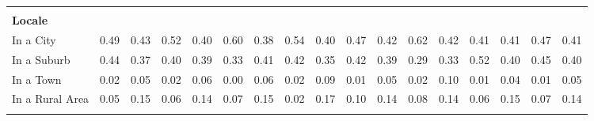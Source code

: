 \begin{tabular*}{\linewidth}{@{\extracolsep{\fill} } lcccccccccccccccc}
&&&&&&&&&&&&&&&&\\%
\multicolumn{17}{l}{\bfseries Locale}\\%
\hspace{0.2cm}In a City&0.49&0.43&0.52&0.40&0.60&0.38&0.54&0.40&0.47&0.42&0.62&0.42&0.41&0.41&0.47&0.41\\%
\hspace{0.2cm}In a Suburb&0.44&0.37&0.40&0.39&0.33&0.41&0.42&0.35&0.42&0.39&0.29&0.33&0.52&0.40&0.45&0.40\\%
\hspace{0.2cm}In a Town&0.02&0.05&0.02&0.06&0.00&0.06&0.02&0.09&0.01&0.05&0.02&0.10&0.01&0.04&0.01&0.05\\%
\hspace{0.2cm}In a Rural Area&0.05&0.15&0.06&0.14&0.07&0.15&0.02&0.17&0.10&0.14&0.08&0.14&0.06&0.15&0.07&0.14\\%
&&&&&&&&&&&&&&&&\\%
\hline%
\end{tabular*}